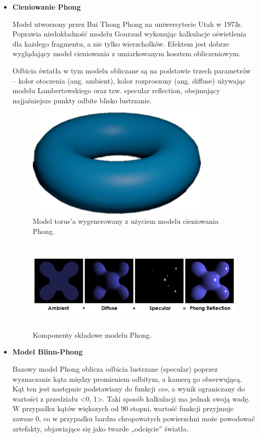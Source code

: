 \begin{itemize}
	\item \textbf{Cieniowanie Phong}

	Model utworzony przez Bui Thong Phong na uniwersytecie Utah w 1973r. Poprawia niedokładność modelu Gouraud wykonując kalkulacje oświetlenia dla każdego fragmentu, a nie tylko wierzchołków. Efektem jest dobrze wyglądający model cieniowania z umiarkowanym kosztem obliczeniowym.
	
	Odbicia światła w tym modelu obliczane są na podstawie trzech parametrów -- kolor otoczenia (ang. ambient), kolor rozproszony (ang. diffuse) używając modelu Lambertowskiego oraz tzw. specular reflection, obejmujący najjaśniejsze punkty odbite blisko lustrzanie.

	\begin{figure}[htbp]
		\centering
		\includegraphics[width=3.45833in,height=2.08328in]{images/5_phong_shading_torus.png}
		\caption{Model torus'a wygenerowany z użyciem modelu cieniowania Phong.}
	\end{figure}
	\begin{figure}[htbp]
		\centering
		\includegraphics[width=6.25833in,height=1.74167in]{images/6_phong_shading_components.png}
		\caption{Komponenty składowe modelu Phong. \cite{wiki:phong:2024}}
	\end{figure}
	
	\item \textbf{Model Blinn-Phong}
	
	Bazowy model Phong oblicza odbicia lustrzane (specular) poprzez wyznaczanie kąta między promieniem odbitym, a kamerą go obserwującą. Kąt ten jest następnie podstawiany do funkcji \emph{cos}, a wynik ograniczany do wartości z przedziału \textless0, 1\textgreater. Taki sposób kalkulacji ma jednak swoją wadę. W przypadku kątów większych od 90 stopni, wartość funkcji przyjmuje zawsze 0, co w przypadku bardzo chropowatych powierzchni może powodować artefakty, objawiające się jako twarde „odcięcie'' światła.
	

\end{itemize}
